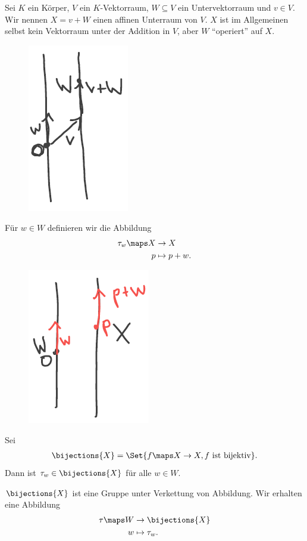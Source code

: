 \begin{beispiel}\label{affiner_unterraum}
    Sei \( K \) ein Körper, \( V \) ein \( K \)-Vektorraum, \( W\subseteq V \) ein Untervektorraum und \( v\in V \). 
    Wir nennen \( X=v+W \) einen affinen Unterraum von \( V \). 
    \( X \) ist im Allgemeinen selbst kein Vektorraum unter der Addition in \( V \), aber \( W \) \enquote{operiert} auf \( X \).
    \begin{figure}[H]
        \centering
        \includegraphics[width=0.2\linewidth]{figures/affiner_unterraum}
        \label{fig:affiner_unterraum}
    \end{figure}
    
    Für \( w\in W \) definieren wir die Abbildung
    \begin{align*}
        \tau_w\maps \begin{aligned}[t] 
            X&\to X\\
            p &\mapsto p+w.
        \end{aligned}
    \end{align*}
    \begin{figure}[H]
        \centering
        \includegraphics[width=0.2\linewidth]{figures/tau_w}
        \label{fig:tau_w}
    \end{figure}
    Sei
    \begin{align*}
        \bijections{X}=\Set{f\maps X\to X, f \text{ ist bijektiv}}.
    \end{align*}
    Dann ist \( \tau_w\in \bijections{X} \) für alle \( w\in W \).
\end{beispiel}
\begin{bemerkung*}
    \( \bijections{X} \) ist eine Gruppe unter Verkettung von Abbildung. 
    Wir erhalten eine Abbildung
    \begin{align*}
        \tau\maps \begin{aligned}[t] 
            W &\to \bijections{X}\\
            w &\mapsto \tau_w.
        \end{aligned}
    \end{align*}
\end{bemerkung*}

